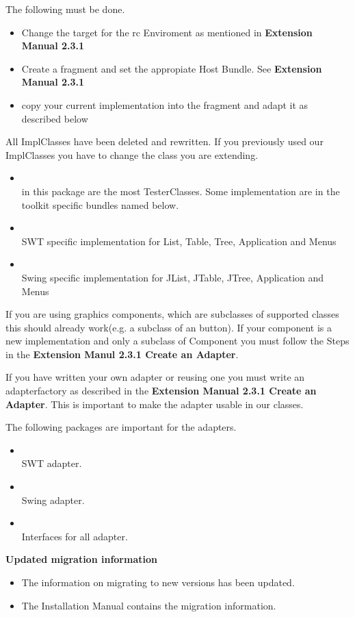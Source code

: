 The following must be done.
\begin{itemize}
\item Change the target for the rc Enviroment as mentioned in \textbf{Extension Manual 2.3.1}
\item Create a fragment and set the appropiate Host Bundle. See \textbf{Extension Manual 2.3.1}
\item copy your current implementation into the fragment and adapt it as described below
\end{itemize}
All ImplClasses have been deleted and rewritten. If you previously used our ImplClasses you
have to change the class you are extending.
\begin{itemize}
\item {}\\ in this package are the
  most TesterClasses. Some implementation are in the toolkit specific
  bundles named below.
\item {}\\ SWT specific implementation
 for List, Table, Tree, Application and Menus
\item {}\\ Swing specific
  implementation for JList, JTable, JTree, Application and Menus
\end{itemize}

If you are using graphics components, which are subclasses of supported classes
this should already work(e.g. a subclass of an button). If your
component is a new implementation and only a subclass of Component you must follow the Steps in the \textbf{Extension Manul 2.3.1 Create an Adapter}.

If you have written your own adapter or reusing one you must write an
adapterfactory as described in the \textbf{Extension Manual 2.3.1 Create an Adapter}. This is important to make
the adapter usable in our classes.

The following packages are important for the adapters.
\begin{itemize}
\item {}\\ SWT adapter.
\item {}\\ Swing adapter.
\item {}\\Interfaces for all adapter.
\end{itemize}

\textbf{Updated migration information}
\begin{itemize}
\item The information on migrating to new versions has been updated.
\item The Installation Manual contains the migration information. 
\end{itemize}
